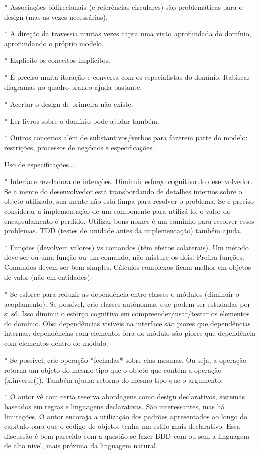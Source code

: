 \documentclass[a4paper, 12pt]{article}
\begin{document}
* Associações bidirecionais (e referências circulares) são problemáticas para o design (mas as vezes necessárias).

* A direção da travessia muitas vezes capta uma visão aprofundada do domínio, aprofundando o próprio modelo. 

* Explicite os conceitos implícitos.

* É preciso muita iteração e conversa com os especialistas do domínio. Rabiscar diagramas no quadro branco ajuda bastante. 

* Acertar o design de primeira não existe.

* Ler livros sobre o domínio pode ajudar também.

* Outros conceitos além de substantivos/verbos para fazerem parte do modelo: restrições, processos de negócios e especificações.

Uso de especificações...

* Interface reveladora de intenções. Diminuir esforço cognitivo do desenvolvedor. Se a mente do desenvolvedor está transbordando de detalhes internos sobre o objeto utilizado, sua mente não está limpa para resolver o problema. Se é preciso considerar a implementação de um componente para utilizá-lo, o valor do encapsulamento é perdido. Utilizar bons nomes é um caminho para resolver esses problemas. TDD (testes de unidade antes da implementação) também ajuda.

* Funções (devolvem valores) vs comandos (têm efeitos colaterais). Um método deve ser ou uma função ou um comando, não misture os dois. Prefira funções. Comandos devem ser bem simples. Cálculos complexos ficam melhor em objetos de valor (não em entidades).

* Se esforce para reduzir as dependência entre classes e módulos (diminuir o acoplamento). Se possível, crie classes autônomas, que podem ser estudadas por si só. Isso diminui o esforço cognitivo em compreender/usar/testar os elementos do domínio. Obs: dependências visíveis na interface são piores que dependências internas; dependências com elementos fora do módulo são piores que dependência com elementos dentro do módulo.

* Se possível, crie operação *fechadas* sobre elas mesmas. Ou seja, a operação retorna um objeto do mesmo tipo que o objeto que contém a operação (x.inverse()). Também ajuda: retorno do mesmo tipo que o argumento.

* O autor vê com certa reserva abordagens como design declarativos, sistemas baseados em regras e linguagens declarativas. São interessantes, mas há limitações. O autor encoraja a utilização dos padrões apresentados ao longo do capítulo para que o código de objetos tenha um estilo mais declarativo. Essa discussão é bem parecido com a questão se fazer BDD com ou sem a linguagem de alto nível, mais próxima da linguagem natural.
\end{document}
